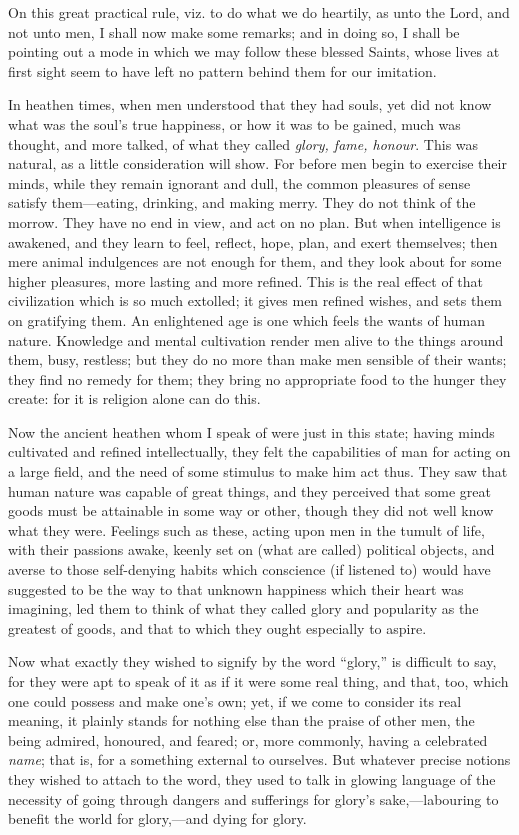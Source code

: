 On this great practical rule, viz. to do what we do heartily, as
unto the Lord, and not unto men, I shall now make some remarks; and in
doing so, I shall be pointing out a mode in which we may follow these
blessed Saints, whose lives at first sight seem to have left no
pattern behind them for our imitation.

In heathen times, when men understood that they had souls, yet did
not know what was the soul's true happiness, or how it was to be
gained, much was thought, and more talked, of what they called \emph{glory,
fame, honour}. This was natural, as a little consideration will
show. For before men begin to exercise their minds, while they remain
ignorant and dull, the common pleasures of sense satisfy them—eating,
drinking, and making merry. They do not think of the morrow. They have
no end in view, and act on no plan. But when intelligence is awakened,
and they learn to feel, reflect, hope, plan, and exert themselves;
then mere animal indulgences are not enough for them, and they look
about for some higher pleasures, more lasting and more refined. This
is the real effect of that civilization which is so much extolled; it
gives men refined wishes, and sets them on gratifying them. An
enlightened age is one which feels the wants of human nature.
Knowledge and mental cultivation render men alive to the things around
them, busy, restless; but they do no more than make men sensible of
their wants; they find no remedy for them; they bring no appropriate
food to the hunger they create: for it is religion alone can do this.

Now the ancient heathen whom I speak of were just in this state;
having minds cultivated and refined intellectually, they felt the
capabilities of man for acting on a large field, and the need of some
stimulus to make him act thus. They saw that human nature was capable
of great things, and they perceived that some great goods must be
attainable in some way or other, though they did not well know what
they were. Feelings such as these, acting upon men in the tumult of
life, with their passions awake, keenly set on (what are called)
political objects, and averse to those self-denying habits which
conscience (if listened to) would have suggested to be the way to that
unknown happiness which their heart was imagining, led them to think
of what they called glory and popularity as the greatest of goods, and
that to which they ought especially to aspire.

Now what exactly they wished to signify by the word
``glory,'' is difficult to say, for they were apt to speak of
it as if it were some real thing, and that, too, which one could
possess and make one's own; yet, if we come to consider its real
meaning, it plainly stands for nothing else than the praise of other
men, the being admired, honoured, and feared; or, more commonly, having a celebrated \emph{name}; that is, for a something external to
ourselves. But whatever precise notions they wished to attach to the
word, they used to talk in glowing language of the necessity of going
through dangers and sufferings for glory's sake,—labouring to
benefit the world for glory,—and dying for glory.

